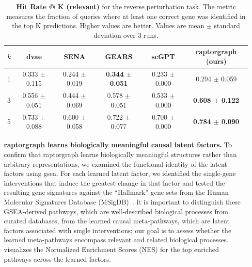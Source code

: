 \documentclass[10pt,letterpaper]{article}
\theoremstyle{definition}
\theoremstyle{remark}
\begin{document}
\begin{table}[!ht]
\centering
\caption{\textbf{Hit Rate @ K (relevant)} for the reverse perturbation task.
The metric measures the fraction of queries where at least one correct gene was identified in the top K predictions.
Higher values are better.
Values are mean $\pm$ standard deviation over 3 runs.}
\begin{tabular}{lccccc}
\toprule
$k$ & \gls{dvae} & SENA & GEARS & scGPT & \gls{raptorgraph} (ours) \\
\midrule
1 & 0.333 $\pm$ 0.115 & 0.244 $\pm$ 0.019 & \textbf{0.344 $\pm$ 0.051} & 0.233 $\pm$ 0.000 & 0.294 $\pm$ 0.059 \\
3 & 0.556 $\pm$ 0.051 & 0.444 $\pm$ 0.069 & 0.578 $\pm$ 0.051 & 0.533 $\pm$ 0.000 & \textbf{0.608 $\pm$ 0.122} \\
5 & 0.733 $\pm$ 0.088 & 0.600 $\pm$ 0.058 & 0.722 $\pm$ 0.077 & 0.700 $\pm$ 0.000 & \textbf{0.784 $\pm$ 0.090} \\
\bottomrule
\end{tabular}
\label{tab:hit_rate}
\end{table}

\textbf{\gls{raptorgraph} learns biologically meaningful causal latent factors.} To confirm that \gls{raptorgraph} learns biologically meaningful structures rather than arbitrary representations, we examined the functional identity of the latent factors using \gls{gsea}.
For each learned latent factor, we identified the single-gene interventions that induce the greatest change in that factor and tested the resulting gene signatures against the ``Hallmark'' gene sets from the Human Molecular Signatures Database (MSigDB)~\cite{liberzon_molecular_2015}.
It is important to distinguish these GSEA-derived pathways, which are well-described biological processes from curated databases, from the learned causal meta-pathways, which are latent factors associated with single interventions; our goal is to assess whether the learned meta-pathways encompass relevant and related biological processes.
 visualizes the Normalized Enrichment Scores (NES) for the top enriched pathways across the learned factors.
\end{document}
